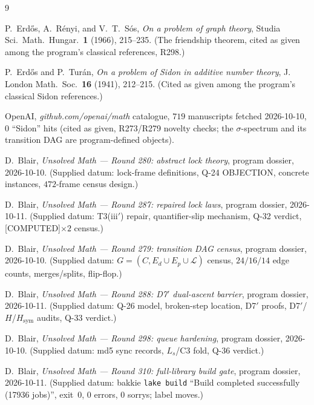 \documentclass[11pt,a4paper]{article}
\theoremstyle{definition}
\begin{document}
\begin{thebibliography}{9}

P.~Erd\H{o}s, A.~R\'enyi, and V.~T.~S\'os,
\emph{On a problem of graph theory},
Studia Sci.\ Math.\ Hungar.\ \textbf{1} (1966), 215--235.
(The friendship theorem, cited as given among the program's classical
references, R298.)

P.~Erd\H{o}s and P.~Tur\'an,
\emph{On a problem of Sidon in additive number theory},
J. London Math.\ Soc.\ \textbf{16} (1941), 212--215.
(Cited as given among the program's classical Sidon references.)

OpenAI,
\emph{github.com/openai/math} catalogue,
$719$ manuscripts fetched 2026-10-10, $0$ ``Sidon'' hits
(cited as given, R273/R279 novelty checks; the $\sigma$-spectrum and
its transition DAG are program-defined objects).

D.~Blair,
\emph{Unsolved Math --- Round 280: abstract lock theory},
program dossier, 2026-10-10.
(Supplied datum: lock-frame definitions, Q-24 OBJECTION, concrete
instances, $472$-frame census design.)

D.~Blair,
\emph{Unsolved Math --- Round 287: repaired lock laws},
program dossier, 2026-10-11.
(Supplied datum: T3(iii$'$) repair, quantifier-slip mechanism, Q-32
verdict, [COMPUTED]$\times2$ census.)

D.~Blair,
\emph{Unsolved Math --- Round 279: transition DAG census},
program dossier, 2026-10-10.
(Supplied datum: $G=(C,E_d\cup E_p\cup\mathcal{L})$ census, $24/16/14$
edge counts, merges/splits, flip-flop.)

D.~Blair,
\emph{Unsolved Math --- Round 288: D7$'$ dual-ascent barrier},
program dossier, 2026-10-11.
(Supplied datum: Q-26 model, broken-step location, D7$'$ proofs,
D7$'$/$H$/$H_{\mathrm{sym}}$ audits, Q-33 verdict.)

D.~Blair,
\emph{Unsolved Math --- Round 298: queue hardening},
program dossier, 2026-10-10.
(Supplied datum: md5 sync records, $L_s$/C3 fold, Q-36 verdict.)

D.~Blair,
\emph{Unsolved Math --- Round 310: full-library build gate},
program dossier, 2026-10-11.
(Supplied datum: bakkie \texttt{lake build} ``Build completed
successfully (17936 jobs)'', exit~0, $0$ errors, $0$ sorrys;
label moves.)

\end{thebibliography}
\end{document}

